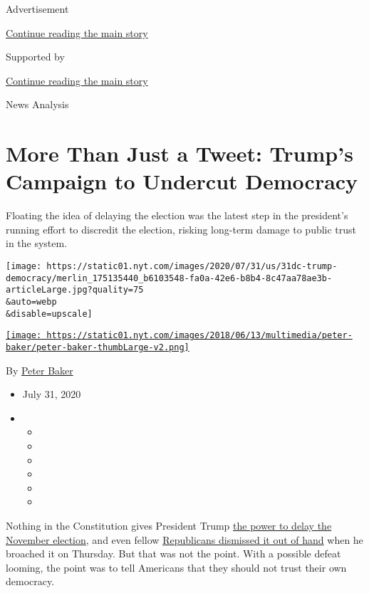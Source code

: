 Advertisement

\protect\hyperlink{after-top}{Continue reading the main story}

Supported by

\protect\hyperlink{after-sponsor}{Continue reading the main story}

News Analysis

\hypertarget{more-than-just-a-tweet-trumps-campaign-to-undercut-democracy}{%
\section{More Than Just a Tweet: Trump's Campaign to Undercut
Democracy}\label{more-than-just-a-tweet-trumps-campaign-to-undercut-democracy}}

Floating the idea of delaying the election was the latest step in the
president's running effort to discredit the election, risking long-term
damage to public trust in the system.

\texttt{[image: https://static01.nyt.com/images/2020/07/31/us/31dc-trump-democracy/merlin\_175135440\_b6103548-fa0a-42e6-b8b4-8c47aa78ae3b-articleLarge.jpg?quality=75\\\&auto=webp\\\&disable=upscale]}

\href{https://www.nytimes.com/by/peter-baker}{\texttt{[image: https://static01.nyt.com/images/2018/06/13/multimedia/peter-baker/peter-baker-thumbLarge-v2.png]}}

By \href{https://www.nytimes.com/by/peter-baker}{Peter Baker}

\begin{itemize}
\item
  July 31, 2020
\item
  \begin{itemize}
  \item
  \item
  \item
  \item
  \item
  \item
  \end{itemize}
\end{itemize}

Nothing in the Constitution gives President Trump
\href{https://www.nytimes.com/2020/07/30/us/politics/trump-postpone-election.html?action=click\&module=Top\%20Stories\&pgtype=Homepage}{the
power to delay the November election}, and even fellow
\href{https://www.nytimes.com/2020/07/30/us/politics/trump-delay-2020-election.html?action=click\&module=Top\%20Stories\&pgtype=Homepage}{Republicans
dismissed it out of hand} when he broached it on Thursday. But that was
not the point. With a possible defeat looming, the point was to tell
Americans that they should not trust their own democracy.

